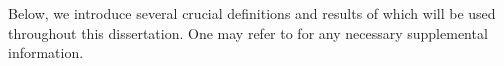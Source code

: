 \documentclass[12pt]{report}
\newcommand{\pf}{{\mathcal P}_f}
\theoremstyle{definition}
\newcommand{\supp}{\hbox{\rm supp}}
\newcommand{\subsupp}{\hbox{\scriptsize\rm supp}}
\begin{document}
Below, we introduce several crucial definitions and
results of \cite{HS} which will be used throughout this dissertation.  
One may refer to \cite{HS} for any necessary supplemental 
information.





\end{document}
